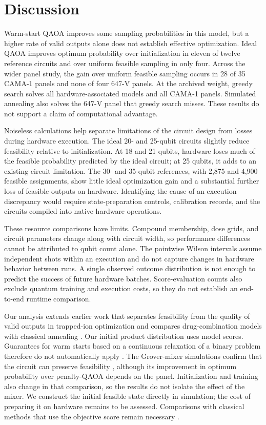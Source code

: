 \documentclass[utf8]{FrontiersinHarvard}
\begin{document}
\section{Discussion}
Warm-start QAOA improves some sampling probabilities in this model, but a higher rate of valid outputs alone does not establish effective optimization. Ideal QAOA improves optimum probability over initialization in eleven of twelve reference circuits and over uniform feasible sampling in only four. Across the wider panel study, the gain over uniform feasible sampling occurs in 28 of 35 CAMA-1 panels and none of four 647-V panels. At the archived weight, greedy search solves all hardware-associated models and all CAMA-1 panels. Simulated annealing also solves the 647-V panel that greedy search misses. These results do not support a claim of computational advantage.

Noiseless calculations help separate limitations of the circuit design from losses during hardware execution. The ideal 20- and 25-qubit circuits slightly reduce feasibility relative to initialization. At 18 and 21 qubits, hardware loses much of the feasible probability predicted by the ideal circuit; at 25 qubits, it adds to an existing circuit limitation. The 30- and 35-qubit references, with 2,875 and 4,900 feasible assignments, show little ideal optimization gain and a substantial further loss of feasible outputs on hardware. Identifying the cause of an execution discrepancy would require state-preparation controls, calibration records, and the circuits compiled into native hardware operations.

These resource comparisons have limits. Compound membership, dose grids, and circuit parameters change along with circuit width, so performance differences cannot be attributed to qubit count alone. The pointwise Wilson intervals assume independent shots within an execution and do not capture changes in hardware behavior between runs. A single observed outcome distribution is not enough to predict the success of future hardware batches. Score-evaluation counts also exclude quantum training and execution costs, so they do not establish an end-to-end runtime comparison.

Our analysis extends earlier work that separates feasibility from the quality of valid outputs in trapped-ion optimization \citep{niroula2022} and compares drug-combination models with classical annealing \citep{ramos2026}. Our initial product distribution uses model scores. Guarantees for warm starts based on a continuous relaxation of a binary problem therefore do not automatically apply \citep{egger2021}. The Grover-mixer simulations confirm that the circuit can preserve feasibility \citep{hadfield2019,bartschi2020}, although its improvement in optimum probability over penalty-QAOA depends on the panel. Initialization and training also change in that comparison, so the results do not isolate the effect of the mixer. We construct the initial feasible state directly in simulation; the cost of preparing it on hardware remains to be assessed. Comparisons with classical methods that use the objective score remain necessary \citep{koch2026}.
\end{document}
